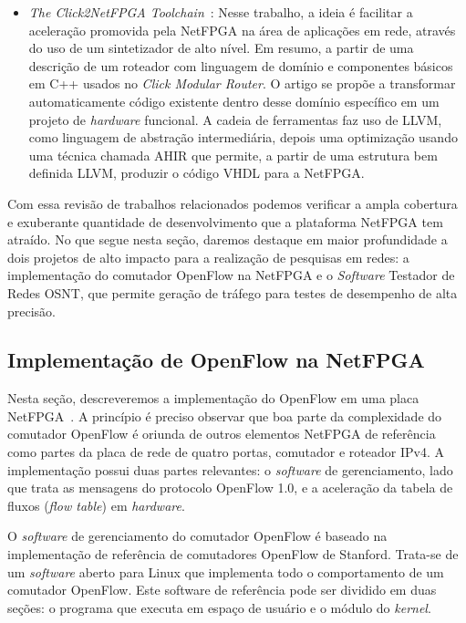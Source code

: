 \begin{itemize}
\item \textit{The Click2NetFPGA Toolchain}~\cite{180848}: Nesse
trabalho, a ideia é facilitar a aceleração promovida pela NetFPGA na
área de aplicações em rede, através do uso de um sintetizador de
alto nível. Em resumo, a partir de uma descrição de um roteador com
linguagem de domínio e componentes básicos em C++ usados no
\textit{Click Modular Router}. O artigo se propõe a transformar
automaticamente código existente dentro desse domínio específico em
um projeto de \textit{hardware} funcional. A cadeia de ferramentas
faz uso de LLVM, como linguagem de abstração intermediária, depois
uma optimização usando uma técnica chamada AHIR que permite, a
partir de uma estrutura bem definida LLVM, produzir o código VHDL
para a NetFPGA.

\end{itemize}

Com essa revisão de trabalhos relacionados podemos verificar a ampla
cobertura e exuberante quantidade de desenvolvimento que a
plataforma NetFPGA tem atraído. No que segue nesta seção, daremos
destaque em maior profundidade a dois projetos de alto impacto para
a realização de pesquisas em redes: a implementação do comutador
OpenFlow na NetFPGA e o \emph{Software} Testador de Redes OSNT, que
permite geração de tráfego para testes de desempenho de alta
precisão.

\subsection{Implementação de OpenFlow na NetFPGA}

Nesta seção, descreveremos a implementação do OpenFlow em uma placa
NetFPGA~\cite{Naous:2008:IOS:1477942.1477944}. A princípio é preciso
observar que boa parte da complexidade do comutador OpenFlow é
oriunda de outros elementos NetFPGA de referência como partes da
placa de rede de quatro portas, comutador e roteador IPv4. A
implementação possui duas partes relevantes: o \emph{software} de
gerenciamento, lado que trata as mensagens do protocolo OpenFlow
1.0, e a aceleração da tabela de fluxos (\textit{flow table}) em
\emph{hardware}.

O \emph{software} de gerenciamento do comutador OpenFlow é baseado
na implementação de referência de comutadores OpenFlow de Stanford.
Trata-se de um \emph{software} aberto para Linux que implementa todo
o comportamento de um comutador OpenFlow. Este software de
referência pode ser dividido em duas seções: o programa que executa
em espaço de usuário e o módulo do \emph{kernel}.

